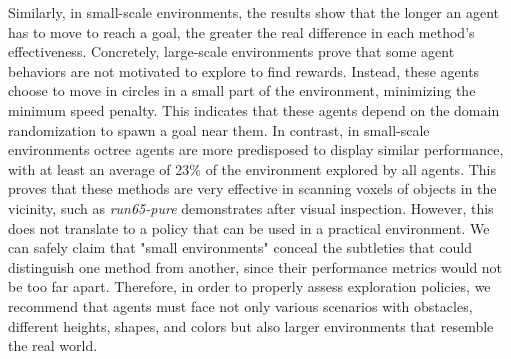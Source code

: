   
    
    
    Similarly, in small-scale environments, the results show that the longer an agent has to move to reach a goal, the greater the real difference in each method's effectiveness.
    Concretely, large-scale environments prove that some agent behaviors are not motivated to explore to find rewards. Instead, these agents choose to move in circles in a small part of the environment, minimizing the minimum speed penalty. This indicates that these agents depend on the domain randomization to spawn a goal near them.
    In contrast, in small-scale environments octree agents are more predisposed to display similar performance, with at least an average of 23\% of the environment explored by all agents.
    This proves that these methods are very effective in scanning voxels of objects in the vicinity, such as \textit{run65-pure} demonstrates after visual inspection. However, this does not translate to a policy that can be used in a practical environment.
    We can safely claim that "small environments" conceal the subtleties that could distinguish one method from another, since their performance metrics would not be too far apart. 
    Therefore, in order to properly assess exploration policies, we recommend that agents must face not only various scenarios with obstacles, different heights, shapes, and colors but also larger environments that resemble the real world.

